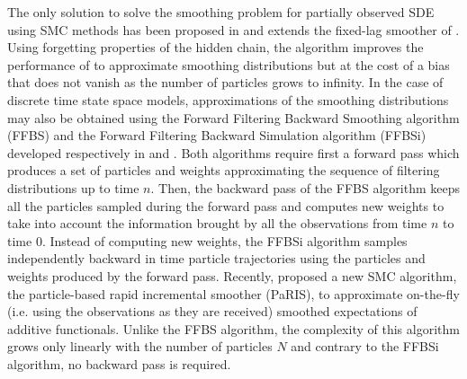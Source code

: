 \documentclass[12pt,draft]{article}
\newcommand{\1}{\mathrm{1}}
\begin{document}
 The only solution to solve the smoothing problem for partially observed SDE using SMC methods has been proposed in \cite{olsson:strojby:2011} and extends the fixed-lag smoother of \cite{olsson:cappe:douc:moulines:2008}. 
 Using forgetting properties of the hidden chain, the algorithm improves the performance of \cite{fearnhead:papaspiliopoulos:roberts:2008} to approximate smoothing distributions but at the cost of a bias that does not vanish as the number of particles grows to infinity.
In the case of discrete time state space models, approximations of the smoothing distributions may also be obtained using the Forward Filtering Backward Smoothing algorithm (FFBS) and  the Forward Filtering Backward Simulation algorithm (FFBSi) developed respectively in \cite{kitagawa:1996,huerzeler:kunsch:1998,doucet:godsill:andrieu:2000} and \cite{godsill:doucet:west:2004}. 
Both algorithms require first a forward pass which produces a set of particles and weights approximating the sequence of filtering distributions up to time $n$. 
Then, the backward pass of the FFBS algorithm keeps all the particles sampled during the forward pass and computes new weights to take into account the information brought by all the observations from time $n$ to time $0$. Instead of computing new weights, the FFBSi  algorithm samples independently backward in time particle trajectories using the particles and weights produced by the forward pass. 
Recently, \cite{olsson:westerborn:2016} proposed a new SMC algorithm, the particle-based rapid incremental smoother (PaRIS), to approximate on-the-fly (i.e. using the observations as they are received) smoothed expectations of additive functionals. 
Unlike the FFBS algorithm, the complexity of this algorithm grows only linearly with the number of particles $N$ and contrary to the FFBSi algorithm, no backward pass is required. 
\end{document}
